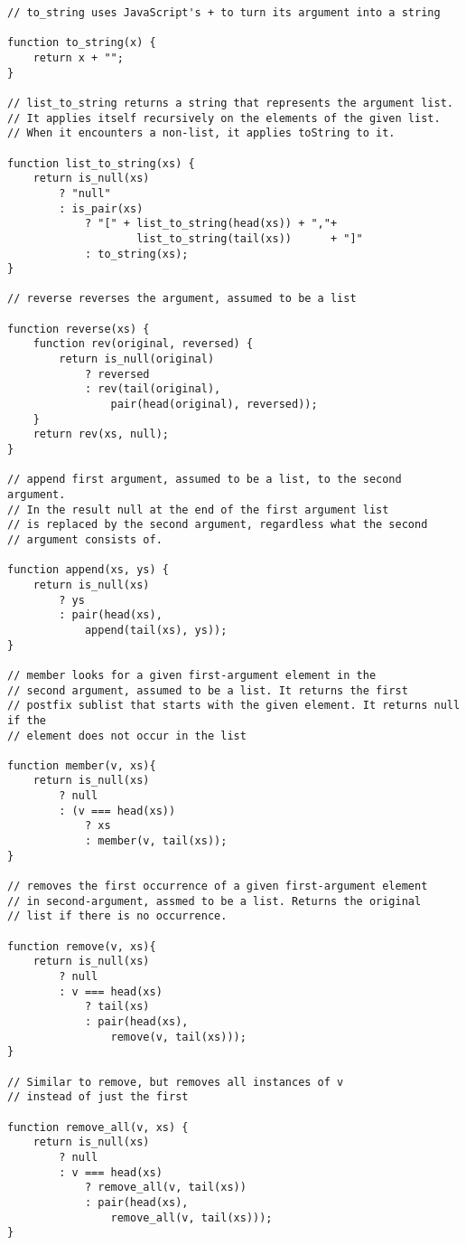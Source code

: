 \begin{lstlisting}
// to_string uses JavaScript's + to turn its argument into a string

function to_string(x) {
    return x + "";
}

// list_to_string returns a string that represents the argument list.
// It applies itself recursively on the elements of the given list.
// When it encounters a non-list, it applies toString to it.

function list_to_string(xs) {
    return is_null(xs)
        ? "null"
        : is_pair(xs)
            ? "[" + list_to_string(head(xs)) + ","+
                    list_to_string(tail(xs))      + "]"
            : to_string(xs);
}

// reverse reverses the argument, assumed to be a list

function reverse(xs) {
    function rev(original, reversed) {
        return is_null(original)
            ? reversed
            : rev(tail(original), 
                pair(head(original), reversed));
    }
    return rev(xs, null);
}

// append first argument, assumed to be a list, to the second argument.
// In the result null at the end of the first argument list
// is replaced by the second argument, regardless what the second
// argument consists of.

function append(xs, ys) {
    return is_null(xs)
        ? ys
        : pair(head(xs),
            append(tail(xs), ys));
} 

// member looks for a given first-argument element in the 
// second argument, assumed to be a list. It returns the first 
// postfix sublist that starts with the given element. It returns null if the 
// element does not occur in the list

function member(v, xs){
    return is_null(xs)
        ? null
        : (v === head(xs))
            ? xs
            : member(v, tail(xs));
}

// removes the first occurrence of a given first-argument element
// in second-argument, assmed to be a list. Returns the original 
// list if there is no occurrence.

function remove(v, xs){
    return is_null(xs)
        ? null
        : v === head(xs)
            ? tail(xs)
            : pair(head(xs), 
                remove(v, tail(xs)));
}

// Similar to remove, but removes all instances of v
// instead of just the first

function remove_all(v, xs) {
    return is_null(xs)
        ? null
        : v === head(xs)
            ? remove_all(v, tail(xs))
            : pair(head(xs), 
                remove_all(v, tail(xs)));
}


\end{lstlisting}
